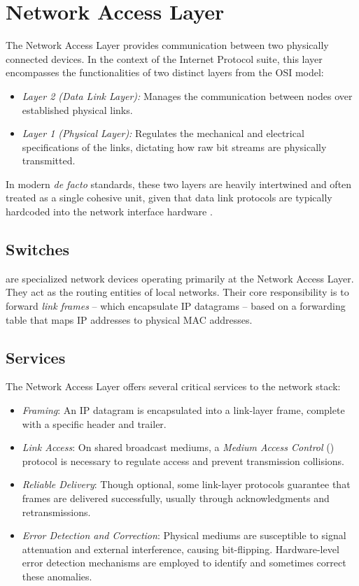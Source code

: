 \chapter{Network Access Layer}
The Network Access Layer provides communication between two physically connected devices. In the context of the Internet Protocol suite, this layer encompasses the functionalities of two distinct layers from the OSI model:
\begin{itemize}
    \item \emph{Layer 2 (Data Link Layer):} Manages the communication between nodes over established physical links.
    \item \emph{Layer 1 (Physical Layer):} Regulates the mechanical and electrical specifications of the links, dictating how raw bit streams are physically transmitted.
\end{itemize}
In modern \emph{de facto} standards, these two layers are heavily intertwined and often treated as a single cohesive unit, given that data link protocols are typically hardcoded into the network interface hardware \cite{kurose2017}.

\section{Switches}
 are specialized network devices operating primarily at the Network Access Layer. They act as the routing entities of local networks. Their core responsibility is to forward \emph{link frames} -- which encapsulate IP datagrams -- based on a forwarding table that maps IP addresses to physical MAC addresses. 

\section{Services}
The Network Access Layer offers several critical services to the network stack:
\begin{itemize}
    \item \emph{Framing}: An IP datagram is encapsulated into a link-layer frame, complete with a specific header and trailer.
    \item \emph{Link Access}: On shared broadcast mediums, a \emph{Medium Access Control} () protocol is necessary to regulate access and prevent transmission collisions.
    \item \emph{Reliable Delivery}: Though optional, some link-layer protocols guarantee that frames are delivered successfully, usually through acknowledgments and retransmissions.
    \item \emph{Error Detection and Correction}: Physical mediums are susceptible to signal attenuation and external interference, causing bit-flipping. Hardware-level error detection mechanisms are employed to identify and sometimes correct these anomalies.
\end{itemize}

